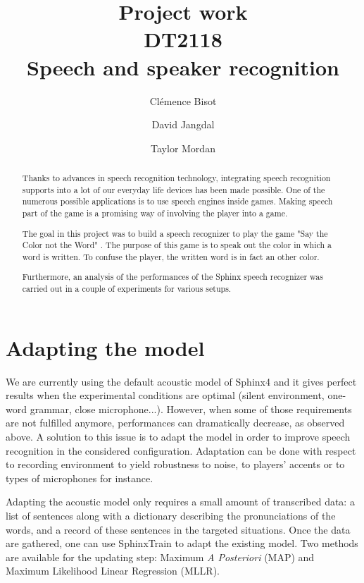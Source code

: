 \documentclass{report}
\begin{document}
\title{Project work\\DT2118\\Speech and speaker recognition}
\author{Cl\'{e}mence Bisot \and David Jangdal \and Taylor Mordan}
\maketitle

\begin{abstract}
Thanks to advances in speech recognition technology, integrating speech recognition supports into a lot of our everyday life devices has been made possible. One of the numerous possible applications is to use speech engines inside games. Making speech part of the game is a promising way of involving the player into a game. 

The goal in this project was to build a speech recognizer to play the game "Say the Color not the Word" \cite{game_site}. The purpose of this game is to speak out the color in which a word is written. To confuse the player, the written word is in fact an other color. 

Furthermore, an analysis of the performances of the Sphinx speech recognizer was carried out in a couple of experiments for various setups.


\end{abstract}





\section*{Adapting the model}
We are currently using the default acoustic model of Sphinx4 and it gives perfect results when the experimental conditions are optimal (silent environment, one-word grammar, close microphone...). However, when some of those requirements are not fulfilled anymore, performances can dramatically decrease, as observed above. A solution to this issue is to adapt the model in order to improve speech recognition in the considered configuration. Adaptation can be done with respect to recording environment to yield robustness to noise, to players' accents or to types of microphones for instance.

Adapting the acoustic model only requires a small amount of transcribed data: a list of sentences along with a dictionary describing the pronunciations of the words, and a record of these sentences in the targeted situations. Once the data are gathered, one can use SphinxTrain to adapt the existing model. Two methods are available for the updating step: Maximum \textit{A Posteriori} (MAP) and Maximum Likelihood Linear Regression (MLLR).
\end{document}
